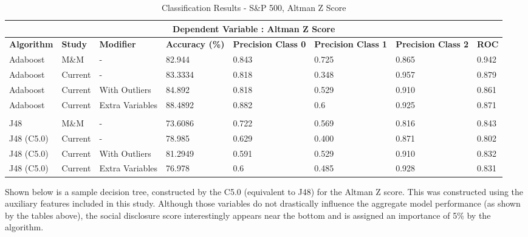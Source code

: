 \begin{table}[h]
\centering
\begin{sideways}%
\begin{tabular}{ |p{2.2cm}|p{1.55cm}|p{2.8cm}||p{2cm}|p{2cm}|p{2cm}|p{2cm}|p{1cm}|  }
 \hline
 \multicolumn{8}{|c|}{\bf Dependent Variable : Altman Z Score} \\
 \hline
{\bf Algorithm} & {\bf Study} & {\bf Modifier} & {\bf Accuracy (\%)} & {\bf Precision Class 0} & {\bf Precision Class 1} &{\bf  Precision Class 2} & {\bf ROC} \\
 \hline
  Adaboost  & M\&M  & - &  82.944     & 0.843 &  0.725 & 0.865 & 0.942  \\
  \rowcolor{gray}Adaboost & Current & - & 83.3334 & 0.818 & 0.348  & 0.957 & 0.879  \\
  Adaboost & Current & With Outliers & 84.892 & 0.818 & 0.529  & 0.910  & 0.861  \\
  \rowcolor{gray}Adaboost & Current & Extra Variables & 88.4892 & 0.882 & 0.6  & 0.925  & 0.871  \\

  & & & & & & &\\
 J48  & M\&M & - &73.6086  & 0.722 &  0.569 & 0.816 & 0.843  \\
 \rowcolor{gray}J48 (C5.0) & Current & - &78.985 & 0.629 & 0.400  & 0.871 &  0.802 \\
 J48 (C5.0) & Current & With Outliers &81.2949 & 0.591 & 0.529 & 0.910  &  0.832 \\
 \rowcolor{gray}J48 (C5.0) & Current & Extra Variables & 76.978  & 0.6 & 0.485 & 0.928  & 0.831   \\
 \hline
\end{tabular}
\end{sideways}
\caption{Classification Results  - S\&P 500, Altman Z Score}
\end{table}
\clearpage
{Shown below is a sample decision tree, constructed by the C5.0 (equivalent to J48) for the Altman Z score. This was constructed using the auxiliary features included in this study. Although those variables do not drastically influence the aggregate model performance (as shown by the tables above), the social disclosure score interestingly appears near the bottom and is assigned an importance of 5\% by the algorithm. }\\
